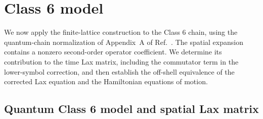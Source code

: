 \section{Class 6 model}
\label{sec:class6-model}

We now apply the finite-lattice construction to the Class 6 chain, using
the quantum-chain normalization of Appendix~A of
Ref.~\cite{deLeeuwFontanellaNietoGarcia2026}.  The spatial expansion
contains a nonzero second-order operator coefficient.  We determine
its contribution to the time Lax matrix, including the commutator
term in the lower-symbol correction, and then establish the off-shell
equivalence of the corrected Lax equation and the Hamiltonian equations
of motion.

\subsection{Quantum Class 6 model and spatial Lax matrix}
\label{sec:class6-spatial-lax}

